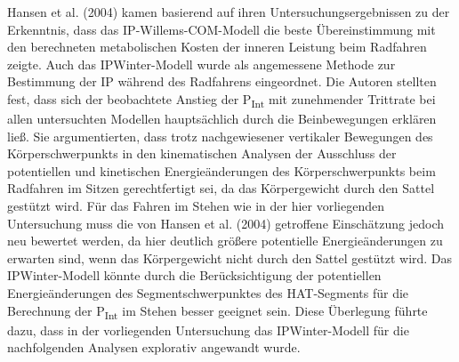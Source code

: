 \documentclass[
  letterpaper,
  DIV=11]{scrartcl}
\begin{document}
Hansen et al. (2004) kamen basierend auf ihren Untersuchungsergebnissen
zu der Erkenntnis, dass das IP-Willems-COM-Modell die beste
Übereinstimmung mit den berechneten metabolischen Kosten der inneren
Leistung beim Radfahren zeigte. Auch das IPWinter-Modell wurde als
angemessene Methode zur Bestimmung der IP während des Radfahrens
eingeordnet. Die Autoren stellten fest, dass sich der beobachtete
Anstieg der P\textsubscript{Int} mit zunehmender Trittrate bei allen
untersuchten Modellen hauptsächlich durch die Beinbewegungen erklären
ließ. Sie argumentierten, dass trotz nachgewiesener vertikaler
Bewegungen des Körperschwerpunkts in den kinematischen Analysen der
Ausschluss der potentiellen und kinetischen Energieänderungen des
Körperschwerpunkts beim Radfahren im Sitzen gerechtfertigt sei, da das
Körpergewicht durch den Sattel gestützt wird. Für das Fahren im Stehen
wie in der hier vorliegenden Untersuchung muss die von Hansen et al.
(2004) getroffene Einschätzung jedoch neu bewertet werden, da hier
deutlich größere potentielle Energieänderungen zu erwarten sind, wenn
das Körpergewicht nicht durch den Sattel gestützt wird. Das
IPWinter-Modell könnte durch die Berücksichtigung der potentiellen
Energieänderungen des Segmentschwerpunktes des HAT-Segments für die
Berechnung der P\textsubscript{Int} im Stehen besser geeignet sein.
Diese Überlegung führte dazu, dass in der vorliegenden Untersuchung das
IPWinter-Modell für die nachfolgenden Analysen explorativ angewandt
wurde.
\end{document}
